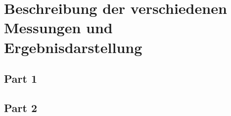 \chapter{Beschreibung der verschiedenen Messungen und Ergebnisdarstellung}

\section{Part 1}


\section{Part 2}